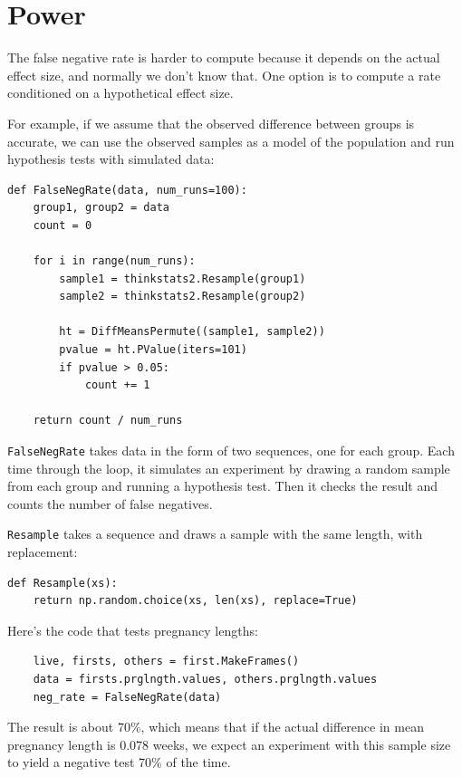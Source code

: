 \documentclass[12pt]{book}
\begin{document}
\section{Power}
\label{power}

The false negative rate is harder to compute because it depends on
the actual effect size, and normally we don't know that.
One option is to compute a rate
conditioned on a hypothetical effect size.

For example, if we assume that the observed difference between groups
is accurate, we can use the observed samples as a model of the
population and run hypothesis tests with simulated data:

\begin{verbatim}
def FalseNegRate(data, num_runs=100):
    group1, group2 = data
    count = 0

    for i in range(num_runs):
        sample1 = thinkstats2.Resample(group1)
        sample2 = thinkstats2.Resample(group2)

        ht = DiffMeansPermute((sample1, sample2))
        pvalue = ht.PValue(iters=101)
        if pvalue > 0.05:
            count += 1

    return count / num_runs
\end{verbatim}

\verb"FalseNegRate" takes data in the form of two sequences, one for
each group.  Each time through the loop, it simulates an experiment by
drawing a random sample from each group and running a hypothesis test.
Then it checks the result and counts the number of false negatives.

\verb"Resample" takes a sequence and draws a sample with the same
length, with replacement:

\begin{verbatim}
def Resample(xs):
    return np.random.choice(xs, len(xs), replace=True)
\end{verbatim}

Here's the code that tests pregnancy lengths:

\begin{verbatim}
    live, firsts, others = first.MakeFrames()
    data = firsts.prglngth.values, others.prglngth.values
    neg_rate = FalseNegRate(data)
\end{verbatim}

The result is about 70\%, which means that if the actual difference in
mean pregnancy length is 0.078 weeks, we expect an experiment with this
sample size to yield a negative test 70\% of the time.
\end{document}
